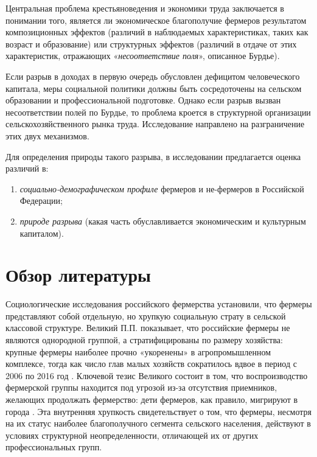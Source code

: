 \documentclass[14pt, a4paper]{article}
\begin{document}
	Центральная проблема крестьяноведения и экономики труда заключается в понимании того, является ли экономическое благополучие фермеров результатом композиционных эффектов (различий в наблюдаемых характеристиках, таких как возраст и образование) или структурных эффектов (различий в отдаче от этих характеристик, отражающих «\textit{несоответствие поля}», описанное Бурдье).
	
	Если разрыв в доходах в первую очередь обусловлен дефицитом человеческого капитала, меры социальной политики должны быть сосредоточены на сельском образовании и профессиональной подготовке. Однако если разрыв вызван несоответствии полей по Бурдье, то проблема кроется в структурной организации сельскохозяйственного рынка труда. Исследование направлено на разграничение этих двух механизмов.
	
	Для определения природы такого разрыва, в исследовании предлагается оценка различий в:
	\begin{enumerate}[label=\arabic*)]
		\item \textit{социально-демографическом профиле} фермеров и не-фермеров в Российской Федерации;	\item \textit{природе разрыва} (какая часть обуславливается экономическим и культурным капиталом).
	\end{enumerate}
	
	\section{Обзор литературы}\label{sec:litreview}
	Социологические исследования российского фермерства установили, что фермеры представляют собой отдельную, но хрупкую социальную страту в сельской классовой структуре. Великий П.П. \cite{velikiy2025fermerstvo} показывает, что российские фермеры не являются однородной группой, а стратифицированы по размеру хозяйства: крупные фермеры наиболее прочно «укоренены» в агропромышленном комплексе, тогда как число глав малых хозяйств сократилось вдвое в период с 2006 по 2016 год . Ключевой тезис Великого состоит в том, что воспроизводство фермерской группы находится под угрозой из-за отсутствия приемников, желающих продолжать фермерство: дети фермеров, как правило, мигрируют в города . Эта внутренняя хрупкость свидетельствует о том, что фермеры, несмотря на их статус наиболее благополучного сегмента сельского населения, действуют в условиях структурной неопределенности, отличающей их от других профессиональных групп.
	
\end{document}
